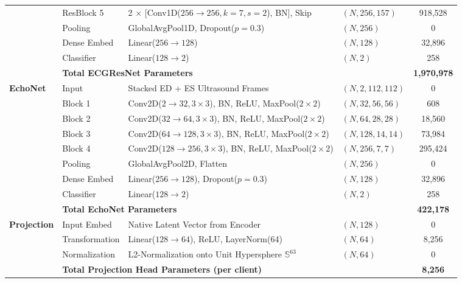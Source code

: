 \documentclass[12pt,a4paper]{amritareport}
\begin{document}
\begin{table}[htbp]
{\begin{tabular}{|l|l|l|l|c|}
		& ResBlock 5 & 2 $\times$ [Conv1D($256 \rightarrow 256, k=7, s=2$), BN], Skip & $(N, 256, 157)$ & 918,528 \\
		& Pooling & GlobalAvgPool1D, Dropout($p=0.3$) & $(N, 256)$ & 0 \\
		& Dense Embed & Linear($256 \rightarrow 128$) & $(N, 128)$ & 32,896 \\
		& Classifier & Linear($128 \rightarrow 2$) & $(N, 2)$ & 258 \\
		\cline{2-5}
		& \multicolumn{3}{l|}{\textbf{Total ECGResNet Parameters}} & \textbf{1,970,978} \\
		\hline
		\multirow{8}{*}{\textbf{EchoNet}} & Input & Stacked ED + ES Ultrasound Frames & $(N, 2, 112, 112)$ & 0 \\
		& Block 1 & Conv2D($2 \rightarrow 32, 3 \times 3$), BN, ReLU, MaxPool($2 \times 2$) & $(N, 32, 56, 56)$ & 608 \\
		& Block 2 & Conv2D($32 \rightarrow 64, 3 \times 3$), BN, ReLU, MaxPool($2 \times 2$) & $(N, 64, 28, 28)$ & 18,560 \\
		& Block 3 & Conv2D($64 \rightarrow 128, 3 \times 3$), BN, ReLU, MaxPool($2 \times 2$) & $(N, 128, 14, 14)$ & 73,984 \\
		& Block 4 & Conv2D($128 \rightarrow 256, 3 \times 3$), BN, ReLU, MaxPool($2 \times 2$) & $(N, 256, 7, 7)$ & 295,424 \\
		& Pooling & GlobalAvgPool2D, Flatten & $(N, 256)$ & 0 \\
		& Dense Embed & Linear($256 \rightarrow 128$), Dropout($p=0.3$) & $(N, 128)$ & 32,896 \\
		& Classifier & Linear($128 \rightarrow 2$) & $(N, 2)$ & 258 \\
		\cline{2-5}
		& \multicolumn{3}{l|}{\textbf{Total EchoNet Parameters}} & \textbf{422,178} \\
		\hline
		\multirow{3}{*}{\textbf{Projection}} & Input Embed & Native Latent Vector from Encoder & $(N, 128)$ & 0 \\
		& Transformation & Linear($128 \rightarrow 64$), ReLU, LayerNorm(64) & $(N, 64)$ & 8,256 \\
		& Normalization & L2-Normalization onto Unit Hypersphere $\mathbb{S}^{63}$ & $(N, 64)$ & 0 \\
		\cline{2-5}
		& \multicolumn{3}{l|}{\textbf{Total Projection Head Parameters (per client)}} & \textbf{8,256} \\
		\hline
	\end{tabular}%
	}
\end{table}
\end{document}
